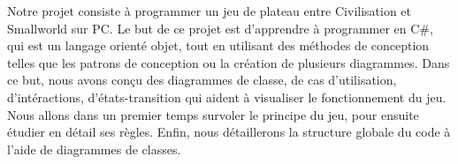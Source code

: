 Notre projet consiste à programmer un jeu de plateau entre Civilisation et Smallworld sur PC. Le but de ce projet est d'apprendre à programmer en C\#, qui est un langage orienté objet, tout en utilisant des méthodes de conception telles que les patrons de conception ou la création de plusieurs diagrammes. Dans ce but, nous avons conçu des diagrammes de classe, de cas d'utilisation, d'intéractions, d'états-transition qui aident à visualiser le fonctionnement du jeu.
Nous allons dans un premier temps survoler le principe du jeu, pour ensuite étudier en détail ses règles. Enfin, nous détaillerons la structure globale du code à l'aide de diagrammes de classes.


